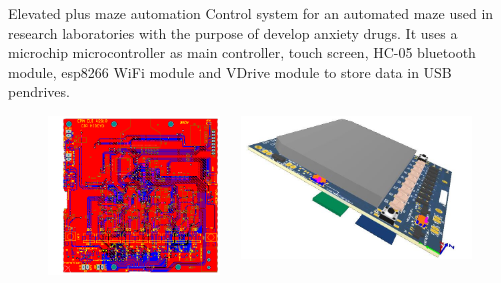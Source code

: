 \documentclass[aspectratio=169]{beamer}
\begin{document}
\begin{frame}{Elevated plus maze automation}
  Control system for an automated maze used in research laboratories with the
  purpose of develop anxiety drugs. It uses a microchip microcontroller as main
  controller, touch screen, HC-05 bluetooth module, esp8266 WiFi module and 
  VDrive module to store data in USB pendrives.

  \begin{figure}[H]
    \centering
    \begin{columns}[T]
      \begin{column}{.3\linewidth}
        \includegraphics[width=\linewidth]{images/EPM-auto1}
      \end{column}
      \begin{column}{.3\linewidth}
        \includegraphics[width=\linewidth]{images/EPM-auto2}

\end{column}
\end{columns}
\end{figure}
\end{frame}
\end{document}
